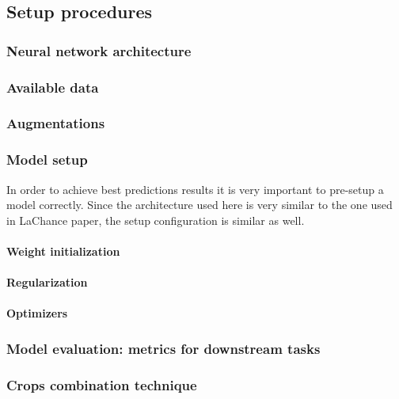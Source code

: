 \subsection{Setup procedures}
    \subsubsection{Neural network architecture}
        
    \subsubsection{Available data}
        
    \subsubsection{Augmentations}
        \label{section:augmentations}
        
    \subsubsection{Model setup}
        In order to achieve best predictions results it is very important to pre-setup a model correctly. Since the architecture used here is very similar to the one used in LaChance paper, the setup configuration is similar as well.  
        \paragraph{Weight initialization}
            
        \paragraph{Regularization}
            \label{section:regularization}
            
        \paragraph{Optimizers}
            
    \subsubsection{Model evaluation: metrics for downstream tasks}
        \label{section:model-evaluation}
        
    \subsubsection{Crops combination technique}\label{par:crops-combination}
        